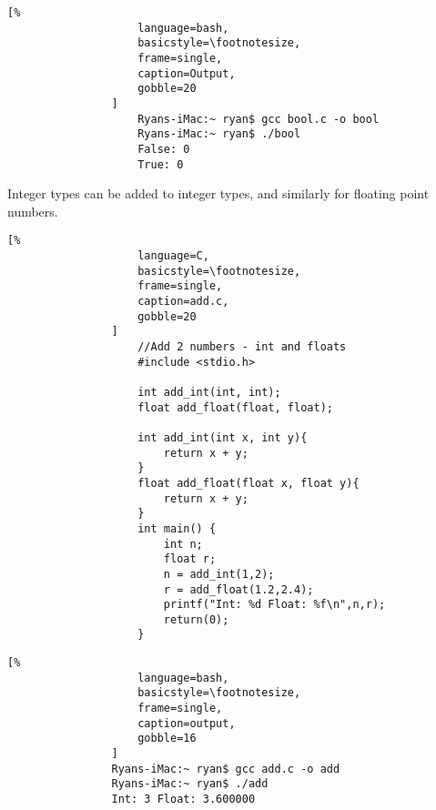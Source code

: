 \documentclass[crop=false,class=article,oneside]{standalone}
\begin{document}
            \begin{minipage}[t]{.48\textwidth}
                \centering
                \begin{lstlisting}[%
                    language=bash,
                    basicstyle=\footnotesize,
                    frame=single,
                    caption=Output,
                    gobble=20
                ]
                    Ryans-iMac:~ ryan$ gcc bool.c -o bool
                    Ryans-iMac:~ ryan$ ./bool
                    False: 0
                    True: 0
                \end{lstlisting}
            \end{minipage}
            Integer types can be added to integer types,
            and similarly for floating point numbers.\newline
            \begin{minipage}[t]{.48\textwidth}
                \centering
                \begin{lstlisting}[%
                    language=C,
                    basicstyle=\footnotesize,
                    frame=single,
                    caption=add.c,
                    gobble=20
                ]
                    //Add 2 numbers - int and floats
                    #include <stdio.h>
                    
                    int add_int(int, int);
                    float add_float(float, float);
                    
                    int add_int(int x, int y){
                        return x + y;
                    }
                    float add_float(float x, float y){
                        return x + y;
                    }
                    int main() {
                        int n;
                        float r;
                        n = add_int(1,2);
                        r = add_float(1.2,2.4);
                        printf("Int: %d Float: %f\n",n,r);
                        return(0);
                    }
                \end{lstlisting}
            \end{minipage}\hfill
            \begin{minipage}[t]{.48\textwidth}
                \centering
                \begin{lstlisting}[%
                    language=bash,
                    basicstyle=\footnotesize,
                    frame=single,
                    caption=output,
                    gobble=16
                ]
                Ryans-iMac:~ ryan$ gcc add.c -o add
                Ryans-iMac:~ ryan$ ./add
                Int: 3 Float: 3.600000
                \end{lstlisting}
            \end{minipage}
\end{document}
